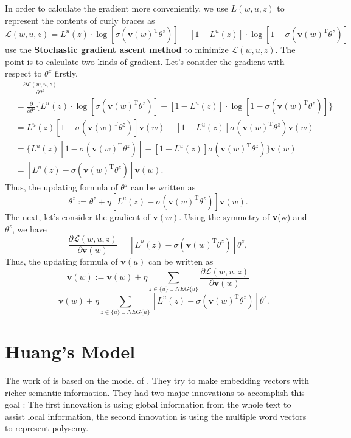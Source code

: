 In order to calculate the gradient more conveniently, we use $L(w,u,z)$ to represent the contents of curly braces as
$$\mathcal{L}(w,u,z)=L^u(z)\cdot \log[\sigma(\mathbf{v}(w)^{\mathrm{T}}\theta^z)]+[1-L^u(z)]\cdot\log[1-\sigma(\mathbf{v}(w)^{\mathrm{T}}\theta^z)]$$
\cite{MikolovSutskeverEtAl2013} use the \textbf{Stochastic gradient ascent method} to minimize $\mathcal{L}(w,u,z)$. The point is to calculate two kinds of gradient. Let's consider the gradient with respect to $\theta^z$ firstly.
\begin{align*}
& \ \ \ \ \frac{\partial\mathcal{L}(w,u,z)}{\partial\theta^z} \\
& =  \frac{\partial}{\partial\theta^z} \{ L^u(z)\cdot \log[\sigma(\mathbf{v}(w)^{\mathrm{T}}\theta^z)]+[1-L^u(z)]\cdot\log[1-\sigma(\mathbf{v}(w)^{\mathrm{T}}\theta^z)] \} \\
& =  L^u(z)[1-\sigma(\mathbf{v}(w)^{\mathrm{T}}\theta^z)]\mathbf{v}(w) - [1-L^u(z)]\sigma(\mathbf{v}(w)^{\mathrm{T}}\theta^z)\mathbf{v}(w) \\
& = \{L^u(z)[1-\sigma(\mathbf{v}(w)^{\mathrm{T}}\theta^z)]-[1-L^u(z)]\sigma(\mathbf{v}(w)^{\mathrm{T}}\theta^z)\}\mathbf{v}(w) \\
& = [L^u(z)-\sigma(\mathbf{v}(w)^{\mathrm{T}}\theta^z)] \mathbf{v}(w).
\end{align*}
Thus, the updating formula of $\theta^z$ can be written as
$$\theta^z:=\theta^z+\eta[L^u(z)-\sigma(\mathbf{v}(w)^{\mathrm{T}}\theta^z)]\mathbf{v}(w).$$
The next, let's consider the gradient of $\mathbf{v}(w)$. Using the symmetry of \textbf{v}(w) and $\theta^z$, we have
$$\frac{\partial\mathcal{L}(w,u,z)}{\partial\mathbf{v}(w)} = [L^u(z)-\sigma(\mathbf{v}(w)^{\mathrm{T}}\theta^z)]\theta^z,$$
Thus, the updating formula of $\mathbf{v}(u)$ can be written as 
$$\mathbf{v}(w):=\mathbf{v}(w)+\eta\sum_{z\in\{u\}\cup NEG\{u\}}\frac{\partial\mathcal{L}(w,u,z)}{\partial\mathbf{v}(w)}$$
$$=\mathbf{v}(w)+\eta\sum_{z\in\{u\}\cup NEG\{u\}}[L^u(z)-\sigma(\mathbf{v}(w)^{\mathrm{T}}\theta^z)]\theta^z.$$

\section{Huang's Model}


The work of \cite{HuangSocherEtAl2012} is based on the model of \cite{CollobertWeston2008}. They try to make embedding vectors with richer semantic information. They had two major innovations to accomplish this goal : The first innovation is using global information from the whole text to assist local information, the second innovation is using the multiple word vectors to represent polysemy. 

